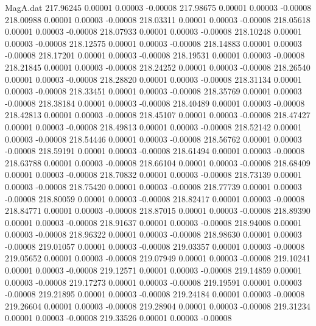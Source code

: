 \begin{filecontents}{MagA.dat}
 217.96245    0.00001    0.00003   -0.00008
 217.98675    0.00001    0.00003   -0.00008
 218.00988    0.00001    0.00003   -0.00008
 218.03311    0.00001    0.00003   -0.00008
 218.05618    0.00001    0.00003   -0.00008
 218.07933    0.00001    0.00003   -0.00008
 218.10248    0.00001    0.00003   -0.00008
 218.12575    0.00001    0.00003   -0.00008
 218.14883    0.00001    0.00003   -0.00008
 218.17201    0.00001    0.00003   -0.00008
 218.19531    0.00001    0.00003   -0.00008
 218.21845    0.00001    0.00003   -0.00008
 218.24252    0.00001    0.00003   -0.00008
 218.26540    0.00001    0.00003   -0.00008
 218.28820    0.00001    0.00003   -0.00008
 218.31134    0.00001    0.00003   -0.00008
 218.33451    0.00001    0.00003   -0.00008
 218.35769    0.00001    0.00003   -0.00008
 218.38184    0.00001    0.00003   -0.00008
 218.40489    0.00001    0.00003   -0.00008
 218.42813    0.00001    0.00003   -0.00008
 218.45107    0.00001    0.00003   -0.00008
 218.47427    0.00001    0.00003   -0.00008
 218.49813    0.00001    0.00003   -0.00008
 218.52142    0.00001    0.00003   -0.00008
 218.54446    0.00001    0.00003   -0.00008
 218.56762    0.00001    0.00003   -0.00008
 218.59191    0.00001    0.00003   -0.00008
 218.61494    0.00001    0.00003   -0.00008
 218.63788    0.00001    0.00003   -0.00008
 218.66104    0.00001    0.00003   -0.00008
 218.68409    0.00001    0.00003   -0.00008
 218.70832    0.00001    0.00003   -0.00008
 218.73139    0.00001    0.00003   -0.00008
 218.75420    0.00001    0.00003   -0.00008
 218.77739    0.00001    0.00003   -0.00008
 218.80059    0.00001    0.00003   -0.00008
 218.82417    0.00001    0.00003   -0.00008
 218.84771    0.00001    0.00003   -0.00008
 218.87015    0.00001    0.00003   -0.00008
 218.89390    0.00001    0.00003   -0.00008
 218.91637    0.00001    0.00003   -0.00008
 218.94008    0.00001    0.00003   -0.00008
 218.96322    0.00001    0.00003   -0.00008
 218.98630    0.00001    0.00003   -0.00008
 219.01057    0.00001    0.00003   -0.00008
 219.03357    0.00001    0.00003   -0.00008
 219.05652    0.00001    0.00003   -0.00008
 219.07949    0.00001    0.00003   -0.00008
 219.10241    0.00001    0.00003   -0.00008
 219.12571    0.00001    0.00003   -0.00008
 219.14859    0.00001    0.00003   -0.00008
 219.17273    0.00001    0.00003   -0.00008
 219.19591    0.00001    0.00003   -0.00008
 219.21895    0.00001    0.00003   -0.00008
 219.24184    0.00001    0.00003   -0.00008
 219.26604    0.00001    0.00003   -0.00008
 219.28904    0.00001    0.00003   -0.00008
 219.31234    0.00001    0.00003   -0.00008
 219.33526    0.00001    0.00003   -0.00008

\end{filecontents}
